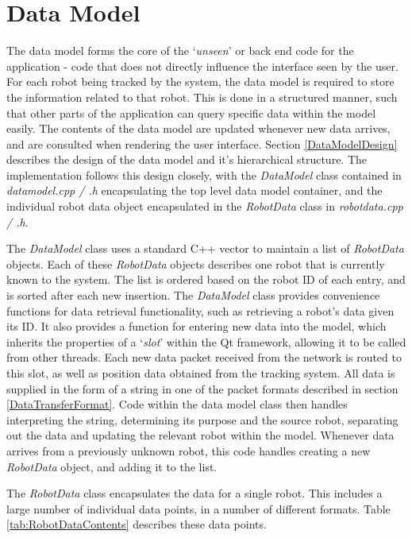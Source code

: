
\section{Data Model} \label{DataModel}
The data model forms the core of the `\textit{unseen}' or back end code for the application - code that does not directly influence the interface seen by the user. For each robot being tracked by the system, the data model is required to store the information related to that robot. This is done in a structured manner, such that other parts of the application can query specific data within the model easily. The contents of the data model are updated whenever new data arrives, and are consulted when rendering the user interface. Section \ref{DataModelDesign} describes the design of the data model and it's hierarchical structure. The implementation follows this design closely, with the \textit{DataModel} class contained in \textit{datamodel.cpp / .h} encapsulating the top level data model container, and the individual robot data object encapsulated in the \textit{RobotData} class in \textit{robotdata.cpp / .h}. 

The \textit{DataModel} class uses a standard C++ vector to maintain a list of \textit{RobotData} objects. Each of these \textit{RobotData} objects describes one robot that is currently known to the system. The list is ordered based on the robot ID of each entry, and is sorted after each new insertion. The \textit{DataModel} class provides convenience functions for data retrieval functionality, such as retrieving a robot's data given its ID. It also provides a function for entering new data into the model, which inherits the properties of a `\textit{slot}' within the Qt framework, allowing it to be called from other threads. Each new data packet received from the network is routed to this slot, as well as position data obtained from the tracking system. All data is supplied in the form of a string in one of the packet formats described in section \ref{DataTransferFormat}. Code within the data model class then handles interpreting the string, determining its purpose and the source robot, separating out the data and updating the relevant robot within the model. Whenever data arrives from a previously unknown robot, this code handles creating a new \textit{RobotData} object, and adding it to the list.

The \textit{RobotData} class encapsulates the data for a single robot. This includes a large number of individual data points, in a number of different formats. Table \ref{tab:RobotDataContents} describes these data points.

